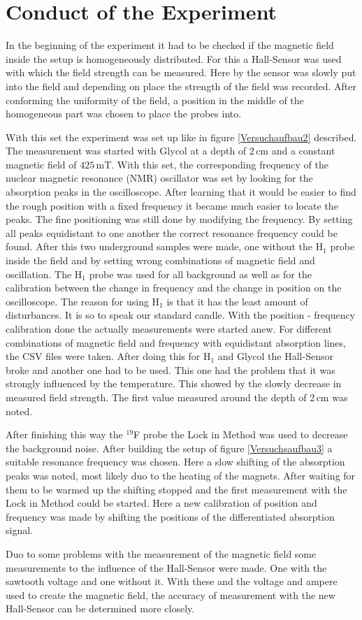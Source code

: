 \section{Conduct of the Experiment}
In the beginning of the experiment it had to be checked if the magnetic field inside the setup is homogeneously distributed. For this a Hall-Sensor was used with which the field strength can be measured. Here by the sensor was slowly put into the field and depending on place the strength of the field was recorded. After conforming the uniformity of the field, a position in the middle of the homogeneous part was chosen to place the probes into.\par
With this set the experiment was set up like in figure \ref{Versuchaufbau2} described. The measurement was started with Glycol at a depth of $2$\,cm and a constant magnetic field of $425\,$mT. With this set, the corresponding frequency of the nuclear magnetic resonance (NMR) oscillator was set by looking for the absorption peaks in the oscilloscope. After learning that it would be easier to find the rough position with a fixed frequency it became much easier to locate the peaks. The fine positioning was still done by modifying the frequency. By setting all peaks equidistant to one another the correct resonance frequency could be found. After this two underground samples were made, one without the H$_1$ probe inside the field and by setting wrong combinations of magnetic field and oscillation. The H$_1$ probe was used for all background as well as for the calibration between the change in frequency and the change in position on the oscilloscope. The reason for using H$_1$ is that it has the least amount of disturbances. It is so to speak our standard candle. With the position - frequency calibration done the actually measurements were started anew. For different combinations of magnetic field and frequency with equidistant absorption lines, the CSV files were taken. After doing this for H$_1$ and Glycol the Hall-Sensor broke and another one had to be used. This one had the problem that it was strongly influenced by the temperature. This showed by the slowly decrease in measured field strength. The first value measured around the depth of $2\,$cm was noted.\par 
After finishing this way the $^{19}$F probe the Lock in Method was used to decrease the background noise. After building the setup of figure \ref{Versuchsaufbau3} a suitable resonance frequency was chosen. Here a slow shifting of the absorption peaks was noted, most likely duo to the heating of the magnets. After waiting for them to be warmed up the shifting stopped and the first measurement with the Lock in Method could be started. Here a new calibration of position and frequency was made by shifting the positions of the differentiated absorption signal.\par
Duo to some problems with the measurement of the magnetic field some measurements to the influence of the Hall-Sensor were made. One with the sawtooth voltage and one without it. With these and the voltage and ampere used to create the magnetic field, the accuracy of measurement with the new Hall-Sensor can be determined more closely.